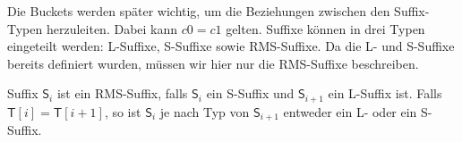 Die Buckets werden später wichtig, um die Beziehungen zwischen den Suffix-Typen herzuleiten. Dabei kann $c0=c1$ gelten. 
\fi
Suffixe können in drei Typen eingeteilt werden: L-Suffixe, S-Suffixe sowie RMS-Suffixe. Da die L- und S-Suffixe bereits definiert wurden, müssen wir hier nur die RMS-Suffixe beschreiben.
\iffalse
\begin{definition}
	Suffix $\mathsf{S}_i$ ist ein
	\begin{itemize}
		\item L-Suffix, falls $\mathsf{T}[i] > \mathsf{T}[i+1]$ oder $i=n-1$.
		\item S-Suffix, falls $\mathsf{T}[i] < \mathsf{T}[i+1]$.
		\item RMS-Suffix, falls $\mathsf{S}_i$ ein S-Suffix und $\mathsf{S}_{i+1}$ ein L-Suffix ist.
	\end{itemize}
	Falls $\mathsf{T}[i] = \mathsf{T}[i+1]$, so ist $\mathsf{S}_i$ je nach Typ von $\mathsf{S}_{i+1}$ entweder ein L- oder ein S-Suffix.
\end{definition}
\fi
\begin{definition}
	Suffix $\mathsf{S}_i$ ist ein RMS-Suffix, falls $\mathsf{S}_i$ ein S-Suffix und $\mathsf{S}_{i+1}$ ein L-Suffix ist.
	Falls $\mathsf{T}[i] = \mathsf{T}[i+1]$, so ist $\mathsf{S}_i$ je nach Typ von $\mathsf{S}_{i+1}$ entweder ein L- oder ein S-Suffix.
\end{definition}


